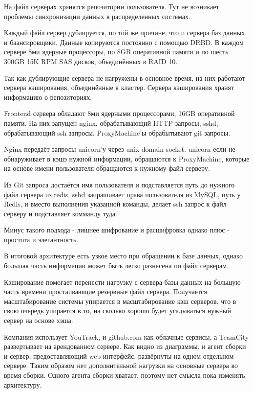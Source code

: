 \documentclass{article}
\begin{document}
На файл серверах хранятся репозитории пользователя. Тут не возникает проблемы синхронизации данных в распределенных системах.

Каждый файл сервер дублируется, по той же причине, что и сервера баз данных и баансировщики. Данные копируются постоянно с помощью DRBD. В каждом сервере 8ми ядерные процессоры, по 8GB оперативной памяти и по шесть 300GB 15K RPM SAS дисков, объединённых в RAID 10.

Так как дублирующие сервера не нагружены в основное время, на них работают сервера кэширования, объединённые в кластер. Сервера кэширования хранят информацию о репозиториях.
\pagebreak

Frontend сервера обладают 8ми ядерными процессорами, 16GB оперативной памяти. На них запущен nginx, обрабатывающий HTTP запросы, sshd, обрабатывающий ssh запросы. ProxyMachine'ы обрабытывают git запросы.

Nginx передаёт запросы unicorn'у через unix domain socket.
unicorn если не обнаруживает в кэшэ нужной информации, обращаются к ProxyMachine, которые на основе имени пользователя обращаются к нужному файл серверу.

Из Git запроса достаётся имя пользователя и подставляется путь до нужного файл сервера из redis.
sshd запрашивает права пользователя из MySQL, путь у Redis, и вместо выполнения указанной команды, делает ssh запрос к файл серверу и подставляет комманду туда.

Минус такого подхода - лишнее шифрование и расшифровка однако плюс - простота и элегантность.
\pagebreak

В итоговой архитектуре есть узкое место при обращении к базе данных, однако большая часть информации может быть легко разнесена по файл серверам.

Кэширование помогает перенести нагрузку с сервера базы данных на большую часть времени простаивающие резервные файл сервера. Получается масштабирование системы упирается в масштабирование кэш серверов, что в свою очередь упирается в то, на сколько хорошо будет угадываться нужный сервер на основе хэша.
\pagebreak

Компания использует YouTrack, и github.com как облачные сервисы, а TeamCity развертывает на арендованном сервере. Как видно из диаграммы, и агент сборки и сервер, предоставляющий web интерфейс, развёрнуты на одном отдельном сервере. Таким образом нет дополнительной нагрузки на основные сервера во время сборки.
Одного агента сборки хватает, поэтому нет смысла пока изменять архитектуру.
\pagebreak
\end{document}
